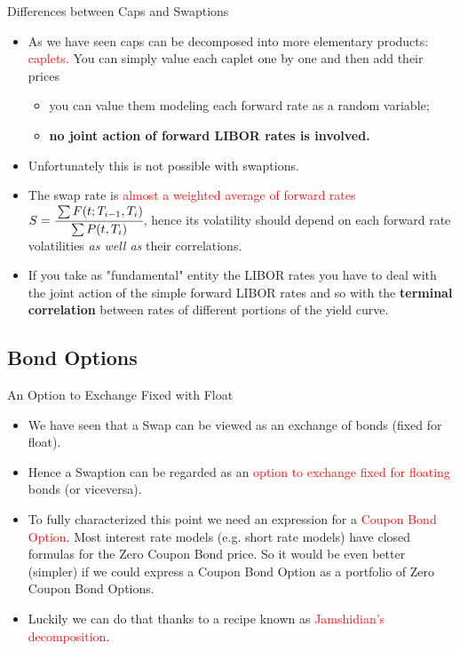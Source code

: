 \documentclass{beamer}
\begin{document}
\begin{frame}{Differences between Caps and Swaptions}
\begin{itemize}
	\item<1-> As we have seen caps can be decomposed into more elementary products: \textcolor{red}{caplets}. You can simply value each caplet one by one and then add their prices
	\begin{itemize}
		\item you can value them modeling each forward rate as a random variable;
		\item \textbf{no joint action of forward LIBOR rates is involved.}
	\end{itemize}
	\item<2-> Unfortunately this is not possible with swaptions.
	\item<3-> The swap rate is \textcolor{red}{almost a weighted average of forward rates} $S=\cfrac{\sum F(t;T_{i-1},T_i)}{\sum P(t,T_i)}$, hence its volatility should depend on each forward rate volatilities \emph{as well as} their correlations.
	\item<4-> If you take as "fundamental" entity the LIBOR rates you have to deal with the joint action of the simple forward LIBOR rates and so with the \textbf{terminal correlation} between rates of different portions of the yield curve. 
\end{itemize}
\end{frame}

\subsection{Bond Options}
\begin{frame}{An Option to Exchange Fixed with Float}
\begin{itemize}
	\item<1-> We have seen that a Swap can be viewed as an exchange of bonds (fixed for float).
	\item<2-> Hence a Swaption can be regarded as an \textcolor{red}{option to exchange fixed for floating} bonds (or viceversa).
	\item<3-> To fully characterized this point we need an expression for a \textcolor{red}{Coupon Bond Option}.
	Most interest rate models (e.g. short rate models) have closed formulas for the Zero Coupon Bond price. So it would be even better (simpler) if we could express a Coupon Bond Option as a portfolio of Zero Coupon Bond Options.
	\item<4-> Luckily we can do that thanks to a recipe known as \textcolor{red}{Jamshidian's decomposition}.
\end{itemize}
\end{frame}
\end{document}
